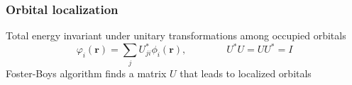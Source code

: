 \documentclass[mathserif]{beamer}
\begin{document}
\begin{frame}
    \frametitle{Orbital localization}
    Total energy invariant under unitary transformations among occupied orbitals
    \begin{equation}
	\varphi_i(\boldsymbol{r}) = \sum_j U_{ji}^\ast \phi_i(\boldsymbol{r}), \qquad \qquad U^\ast U = UU^\ast = I
    \end{equation}
    Foster-Boys algorithm finds a matrix $U$ that leads to localized orbitals\\
    \begin{columns}
    \begin{column}[b]{0.48\linewidth}
    \begin{center}

\end{center}
\end{column}
\end{columns}
\end{frame}
\end{document}
